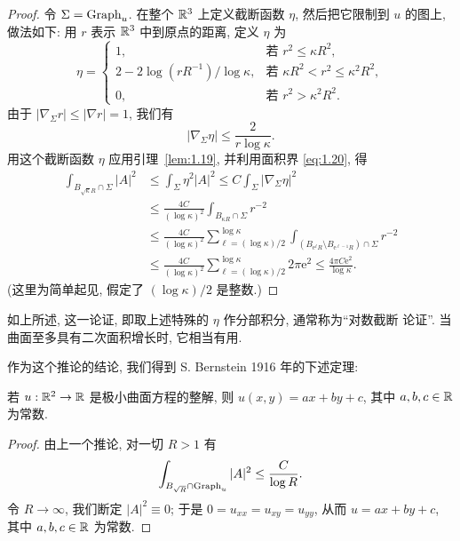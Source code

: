 \begin{proof}
令 $\Sigma=\operatorname{Graph}_u$. 在整个 $\mathbb{R}^3$ 上定义截断函数 $\eta$, 然后把它限制到
$u$ 的图上, 做法如下: 用 $r$ 表示 $\mathbb{R}^3$ 中到原点的距离, 定义 $\eta$ 为
\begin{equation}
\eta=
\begin{cases}
1, & \text{若 } r^{2}\leq\kappa R^{2},\\
2-2\log(rR^{-1})/\log\kappa,
  & \text{若 } \kappa R^{2}<r^{2}\leq\kappa^{2}R^{2},\\
0, & \text{若 } r^{2}>\kappa^{2}R^{2}.
\end{cases}
\label{eq:1.105}
\end{equation}
由于 $|\nabla_{\Sigma}r|\leq|\nabla r|=1$, 我们有
\begin{equation}
\bigl|\nabla_{\Sigma}\eta\bigr|
 \leq\frac{2}{r\log\kappa}.
\label{eq:1.106}
\end{equation}
用这个截断函数 $\eta$ 应用引理~\ref{lem:1.19}, 并利用面积界 \eqref{eq:1.20}, 得
\begin{equation}
\begin{aligned}
\int_{B_{\sqrt{\kappa}R}\cap\Sigma}|A|^{2}
&\leq\int_{\Sigma}\eta^{2}|A|^{2}
 \leq C\int_{\Sigma}\bigl|\nabla_{\Sigma}\eta\bigr|^{2}\\
&\leq\frac{4C}{(\log\kappa)^{2}}
 \int_{B_{\kappa R}\cap\Sigma}r^{-2}\\
&\leq\frac{4C}{(\log\kappa)^{2}}
 \sum_{\ell=(\log\kappa)/2}^{\log\kappa}
 \int_{(B_{\mathrm{e}^{\ell}R}\setminus B_{\mathrm{e}^{\ell-1}R})\cap\Sigma}
 r^{-2}\\
&\leq\frac{4C}{(\log\kappa)^{2}}
 \sum_{\ell=(\log\kappa)/2}^{\log\kappa}2\pi\mathrm{e}^{2}
 \leq\frac{4\pi C\mathrm{e}^{2}}{\log\kappa}.
\end{aligned}
\label{eq:1.107}
\end{equation}
(这里为简单起见, 假定了 $(\log\kappa)/2$ 是整数.)
\end{proof}

如上所述, 这一论证, 即取上述特殊的 $\eta$ 作分部积分, 通常称为``对数截断
论证''. 当曲面至多具有二次面积增长时, 它相当有用.

作为这个推论的结论, 我们得到 S. Bernstein \cite{Be} 1916 年的下述定理:

\begin{theorem}
\label{thm:1.21}
若 $u:\mathbb{R}^2\to\mathbb{R}$ 是极小曲面方程的整解, 则 $u(x,y)=ax+by+c$, 其中
$a,b,c\in\mathbb{R}$ 为常数.
\end{theorem}

\begin{proof}
由上一个推论, 对一切 $R>1$ 有
\begin{equation}
\int_{B_{\sqrt{R}}\cap\operatorname{Graph}_u}|A|^{2}\leq\frac{C}{\log R}.
\label{eq:1.108}
\end{equation}
令 $R\to\infty$, 我们断定 $|A|^{2}\equiv0$; 于是
$0=u_{xx}=u_{xy}=u_{yy}$, 从而 $u=ax+by+c$, 其中 $a,b,c\in\mathbb{R}$ 为常数.
\end{proof}

